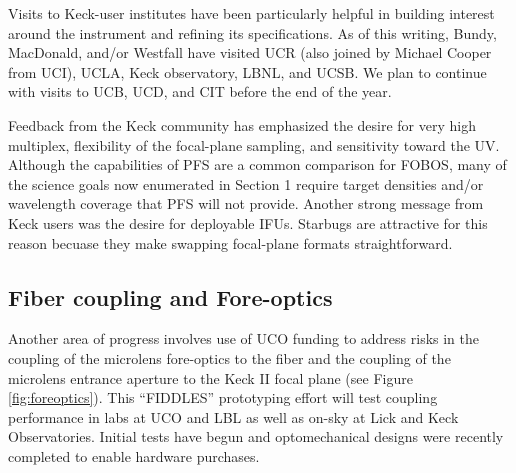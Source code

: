 Visits to Keck-user institutes have been particularly helpful in
building interest around the instrument and refining its
specifications. As of this writing, Bundy, MacDonald, and/or Westfall
have visited UCR (also joined by Michael Cooper from UCI), UCLA, Keck
observatory, LBNL, and UCSB. We plan to continue with visits to UCB, UCD, and CIT before the end of the year.

Feedback from the Keck community has emphasized the desire for very high multiplex, flexibility of the focal-plane
sampling, and sensitivity toward the UV. Although the capabilities of PFS are a common comparison for FOBOS, many of
the science goals now enumerated in Section 1 require target densities and/or wavelength coverage that PFS will not
provide. Another strong message from Keck users was the desire for deployable IFUs. Starbugs are attractive for this
reason becuase they make swapping focal-plane formats straightforward.




\subsection{Fiber coupling and Fore-optics}
Another area of progress involves use of UCO funding to address risks in the
coupling of the microlens fore-optics to the fiber and the coupling
of the microlens entrance aperture to the Keck II focal plane (see Figure \ref{fig:foreoptics}).  This ``FIDDLES'' prototyping effort will test coupling performance in labs at UCO and LBL as well as on-sky at Lick and Keck Observatories.  Initial tests have begun and optomechanical designs were recently completed to enable hardware purchases.


